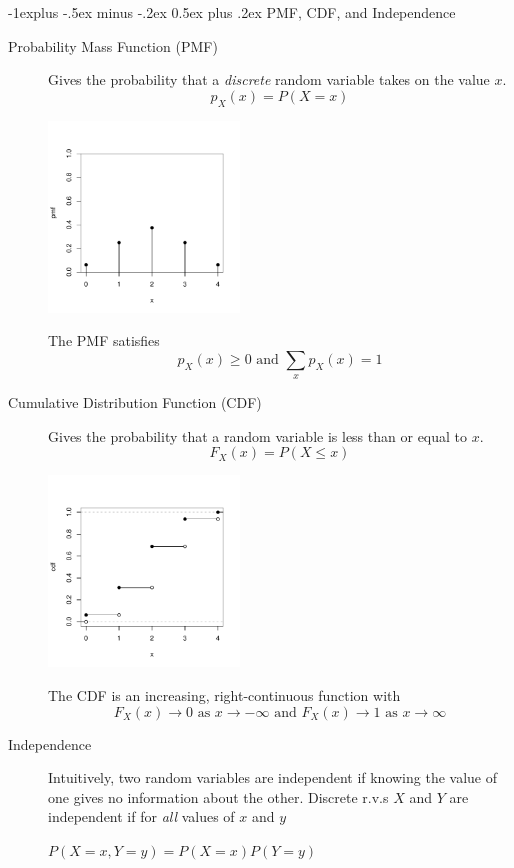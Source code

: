 \documentclass[6pt,landscape]{article}
\makeatletter
\renewcommand{\subsection}{\@startsection{subsection}{2}{0mm}%
                                {-1explus -.5ex minus -.2ex}%
                                {0.5ex plus .2ex}%
                                {\normalfont\normalsize\bfseries}}
\makeatother
\begin{document}
\begin{multicols*}{3}
\subsection{PMF, CDF, and Independence}
\begin{description}

\item[Probability Mass Function (PMF)] 
Gives the probability that a \emph{discrete} random variable takes on the value $x$.
\[ p_X(x) = P(X=x) \]
\begin{minipage}{\linewidth}
            \centering
\includegraphics[width=2in]{figures/Binpmf.pdf}
        \end{minipage}
The PMF satisfies
\[p_X(x) \geq 0 \textrm{ and } \sum_x p_X(x) = 1 \]


\item[Cumulative Distribution Function (CDF)] 
Gives the probability that a random variable is less than or equal to $x$.
\[F_X(x) = P(X \leq x)\]
\begin{minipage}{\linewidth}
            \centering
\includegraphics[width=2in]{figures/Bincdf.pdf}
        \end{minipage}

The CDF is an increasing, right-continuous function with
\[F_X(x) \to 0 \textrm{ as $x \to -\infty$ and } F_X(x) \to 1 \textrm{ as $x \to \infty$} \]
\item[Independence] Intuitively, two random variables are independent if knowing the value of one gives  no information about the other. Discrete r.v.s $X$ and $Y$ are independent if for \emph{all} values of $x$ and $y$  \begin{center}
$P(X=x, Y=y) = P(X = x)P(Y = y)$
\end{center}


\end{description}
\end{multicols*}
\end{document}
